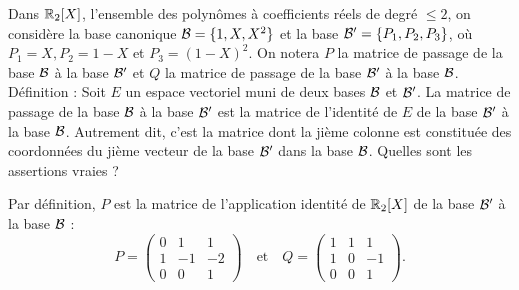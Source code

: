 \begin{question}
Dans $\mathbb{R}_2[X]$, l'ensemble des polynômes à coefficients réels de degré $\le 2$, on considère la base canonique ${\cal {B}} =\{1,X,X^2\}$ et  la base ${\cal {B'}} =\{P_1,P_2,P_3\}$, où 
$P_1=X, P_2=1-X$ et $P_3=(1-X)^2$. On notera $P$ la matrice de passage de la base ${\cal {B}}$ à la base ${\cal {B'}}$ et $Q$ la matrice de passage de la base ${\cal {B'}}$ à la base ${\cal {B}}$.
\vskip1mm
Définition : Soit $E$ un espace vectoriel muni de deux bases ${\cal {B}}$ et ${\cal {B}}'$. La matrice de passage de la base ${\cal {B}}$ à la base  ${\cal {B}}'$ est la matrice de l'identité de $E$ de la base ${\cal {B}}'$ à la base  ${\cal {B}}$. Autrement dit, c'est la matrice dont la jième colonne est constituée des coordonnées du jième vecteur de la base ${\cal {B}'}$ dans la base  ${\cal {B}}$.
\vskip1mm
Quelles sont les assertions vraies ?
\begin{answers}  
\end{answers}
\vskip2mm
\begin{explanations} Par définition, $P$ est la matrice de l'application identité de $\mathbb{R}_2[X]$ de la base ${\cal {B'}}$ à la base ${\cal {B}}$ :
$$P= \left(\begin{array}{rcc}
0&1&1\\1&-1&-2\\ 0&0&1\end{array}\right)\quad \mbox{et}\quad
Q = \left(\begin{array}{rcc}1&1&1\\
1&0&-1\\ 0&0&1\end{array}\right).$$
\end{explanations}
\end{question}

